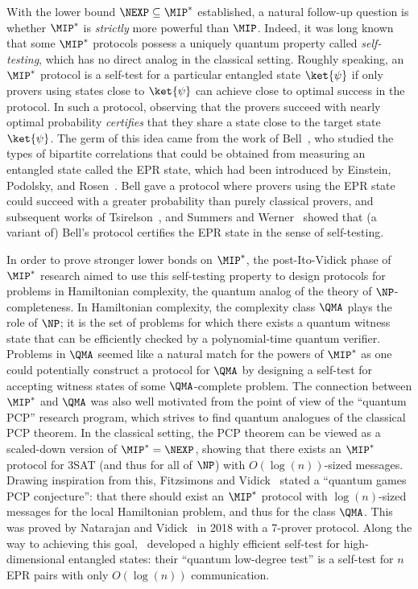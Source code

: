 With the lower bound $\NEXP \subseteq \MIP^*$ established, a natural
follow-up question is whether $\MIP^*$ is \emph{strictly} more powerful
than $\MIP$. Indeed, it was long known that some $\MIP^*$ protocols
possess a uniquely quantum property called \emph{self-testing}, which
has no direct analog in the classical setting. Roughly speaking, an $\MIP^*$ protocol is
a self-test for a particular entangled state $\ket{\psi}$ if only
provers using states close to $\ket{\psi}$ can achieve close to optimal
success in the protocol. In such a protocol, observing that the
provers succeed with nearly optimal probability \emph{certifies} that
they share a state close to the target state $\ket{\psi}$. The germ of
this idea came from the work of Bell~\cite{Bel64}, who studied the types of
bipartite correlations that could be obtained from measuring an
entangled state called the EPR state, which had been introduced by
Einstein, Podolsky, and Rosen~\cite{EPR35}. Bell gave a protocol where
provers using the EPR state could succeed with a greater probability
than purely classical provers, and subsequent works of Tsirelson~\cite{Tsi80}, and Summers and
Werner~\cite{SW88} showed that (a variant of) Bell's protocol certifies
the EPR state in the sense of self-testing.


In order to prove stronger lower bonds on $\MIP^*$, the post-Ito-Vidick phase of
$\MIP^*$ research aimed to use this self-testing property to design protocols
for problems in Hamiltonian complexity, the quantum analog of the
theory of $\NP$-completeness. In Hamiltonian complexity, the complexity class
$\QMA$ plays the role of $\NP$; it is the set of problems for which
there exists a quantum witness state that can be efficiently checked
by a polynomial-time quantum verifier. Problems in $\QMA$ seemed like a natural match for
the powers of $\MIP^*$ as one could potentially construct a protocol for $\QMA$ by
designing a self-test for accepting witness states of some $\QMA$-complete
problem. The connection between $\MIP^*$ and $\QMA$ was also well
motivated from the point of view of the ``quantum PCP'' research
program, which strives to find quantum analogues of the classical PCP
theorem. In the classical setting, the PCP theorem can be viewed as a scaled-down
version of $\MIP^* = \NEXP$, showing that there exists an $\MIP^*$
protocol for 3SAT (and thus for all of $\NP$) with $O(\log(n))$-sized
messages. Drawing inspiration from this, Fitzsimons and Vidick~\cite{FV15}
stated a ``quantum games PCP conjecture'': that there should exist an
$\MIP^*$ protocol with $\log(n)$-sized messages for the local
Hamiltonian problem, and thus for the class $\QMA$. This
was proved by Natarajan and Vidick~\cite{NV18a} in 2018 with a 7-prover protocol. Along the way to achieving
this goal,~\cite{NV18a} developed a highly efficient self-test for
high-dimensional entangled states: their ``quantum low-degree test''
is a self-test for $n$ EPR pairs with only $O(\log(n))$ communication.

